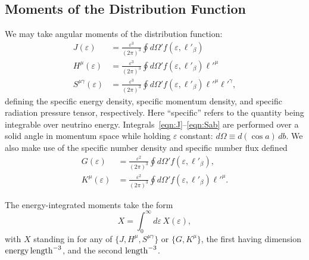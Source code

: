 \documentclass[aps,floatfix,prd,superscriptaddress,twocolumn]{revtex4-1}
\begin{document}

\subsection{Moments of the Distribution Function}
\label{ssec:moments}
We may take angular moments of the distribution function:
\begin{align}
  \label{eqn:J}
  J(\varepsilon) &=
  \frac{\varepsilon^3}{(2\pi)^3} \oint d\Omega' f(\varepsilon, \ell'_\beta) \\
  \label{eqn:Ha}
  H^\mu(\varepsilon) &=
  \frac{\varepsilon^3}{(2\pi)^3} \oint d\Omega' f(\varepsilon, \ell'_\beta) \ell'^\mu \\
  \label{eqn:Sab}
  S^{\mu\gamma}(\varepsilon) &=
  \frac{\varepsilon^3}{(2\pi)^3} \oint d\Omega' f(\varepsilon, \ell'_\beta) \ell'^\mu \ell'^\gamma,
\end{align}
defining the specific energy density,
specific momentum density, and
specific radiation pressure tensor, respectively.
Here ``specific'' refers to the quantity being integrable over neutrino energy.
Integrals~\ref{eqn:J}--\ref{eqn:Sab} are performed over a solid angle in
momentum space while holding $\varepsilon$ constant:
$d\Omega \equiv d(\cos a)\,db$.
We also make use of the specific number density and specific number flux defined
\begin{align}
  \label{eqn:G}
  G(\varepsilon) &=
  \frac{\varepsilon^2}{(2\pi)^3} \oint d\Omega' f(\varepsilon, \ell'_\beta), \\
  \label{eqn:Ka}
  K^\mu(\varepsilon) &=
  \frac{\varepsilon^2}{(2\pi)^3} \oint d\Omega' f(\varepsilon, \ell'_\beta) \ell'^\mu.
\end{align}

The energy-integrated moments take the form
\begin{equation}
  \label{eqn:J_H_S_eps_integrated}
  X = \int_0^\infty d\varepsilon \, X(\varepsilon),
\end{equation}
with $X$ standing in for any of $\{J,H^\mu,S^{\mu\gamma}\}$ or
$\{G,K^\mu\}$,
the first having dimension ${\rm energy}\,{\rm length}^{-3}$,
and the second ${\rm length}^{-3}$.
\end{document}
